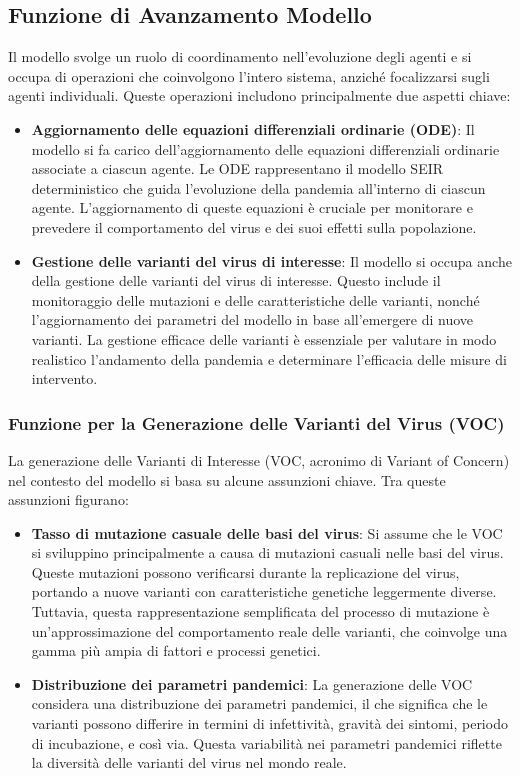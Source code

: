 \subsection{Funzione di Avanzamento Modello}

Il modello svolge un ruolo di coordinamento nell'evoluzione degli agenti 
e si occupa di operazioni che coinvolgono l'intero sistema, 
anziché focalizzarsi sugli agenti individuali. 
Queste operazioni includono principalmente due aspetti chiave:

\begin{itemize}
	\item \textbf{Aggiornamento delle equazioni differenziali 
	ordinarie (ODE)}: Il modello si fa carico dell'aggiornamento 
	delle equazioni differenziali ordinarie associate a ciascun agente. 
	Le ODE rappresentano il modello SEIR deterministico che guida 
	l'evoluzione della pandemia all'interno di ciascun agente. 
	L'aggiornamento di queste equazioni è cruciale per monitorare e 
	prevedere il comportamento del virus e dei suoi effetti sulla 
	popolazione.
	\item \textbf{Gestione delle varianti del virus di interesse}: Il 
	modello si occupa anche della gestione delle varianti del virus 
	di interesse. Questo include il monitoraggio delle mutazioni e 
	delle caratteristiche delle varianti, nonché l'aggiornamento dei 
	parametri del modello in base all'emergere di nuove varianti. 
	La gestione efficace delle varianti è essenziale per valutare in 
	modo realistico l'andamento della pandemia e determinare 
	l'efficacia delle misure di intervento.
\end{itemize}

\subsubsection{Funzione per la Generazione delle Varianti del Virus (VOC)}

La generazione delle Varianti di Interesse 
(VOC, acronimo di Variant of Concern) nel contesto del modello si 
basa su alcune assunzioni chiave. Tra queste assunzioni figurano:

\begin{itemize}
	\item \textbf{Tasso di mutazione casuale delle basi del virus}: 
	Si assume che le VOC si sviluppino principalmente a causa di 
	mutazioni casuali nelle basi del virus. Queste mutazioni possono 
	verificarsi durante la replicazione del virus, portando a nuove 
	varianti con caratteristiche genetiche leggermente diverse. 
	Tuttavia, questa rappresentazione semplificata del processo di 
	mutazione è un'approssimazione del comportamento reale delle 
	varianti, che coinvolge una gamma più ampia di fattori e processi 
	genetici.
	\item \textbf{Distribuzione dei parametri pandemici}: La generazione 
	delle VOC considera una distribuzione dei parametri pandemici, 
	il che significa che le varianti possono differire in termini di 
	infettività, gravità dei sintomi, periodo di incubazione, e così via. 
	Questa variabilità nei parametri pandemici riflette la diversità 
	delle varianti del virus nel mondo reale.
\end{itemize}

